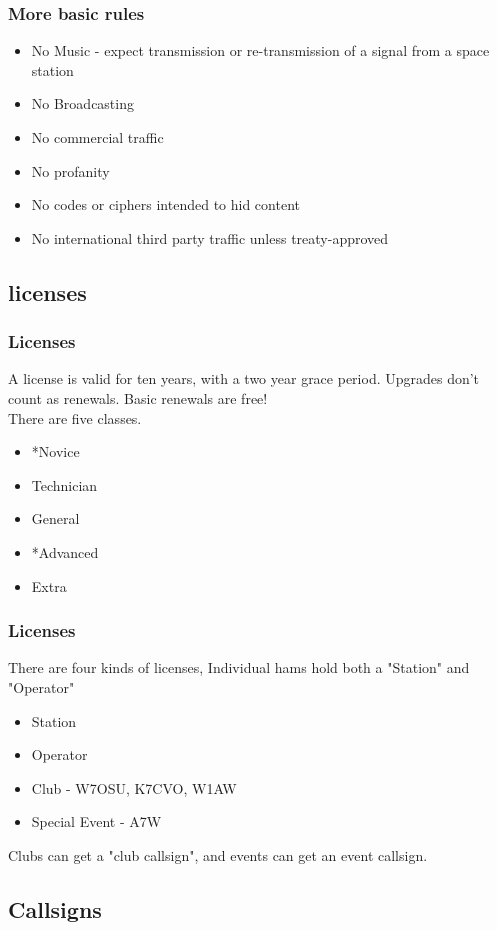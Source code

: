 \documentclass[12pt]{beamer}
\begin{document}
\begin{frame}
\frametitle{More basic rules}
\begin{itemize}
\item No Music - expect transmission or re-transmission of a signal from a space station
\item No Broadcasting
\item No commercial traffic
\item No profanity
\item No codes or ciphers intended to hid content
\item No international third party traffic unless treaty-approved
\end{itemize}
\end{frame}

\subsection{licenses}

\begin{frame}
\frametitle{Licenses}
A license is valid for ten years, with a two year grace period. Upgrades don't count as renewals. Basic renewals are free!\\
There are five classes.
\begin{itemize}
\item *Novice
\item Technician
\item General
\item *Advanced
\item Extra
\end{itemize}
\end{frame}

\begin{frame}
\frametitle{Licenses}
There are four kinds of licenses, Individual hams hold both a "Station" and "Operator"
\begin{itemize}
\item Station
\item Operator
\item Club - W7OSU, K7CVO, W1AW
\item Special Event - A7W
\end{itemize}
Clubs can get a "club callsign", and events can get an event callsign.
\end{frame}

\subsection{Callsigns}
\end{document}
